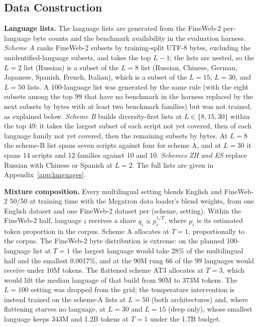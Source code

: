 \subsection{Data Construction}
\label{app:data-construction}

\textbf{Language lists.} The language lists are generated from the FineWeb-2 per-language byte counts and the benchmark availability in the evaluation harness. \emph{Scheme A} ranks FineWeb-2 subsets by training-split UTF-8 bytes, excluding the unidentified-language subsets, and takes the top $L-1$; the lists are nested, so the $L=2$ list (Russian) is a subset of the $L=8$ list (Russian, Chinese, German, Japanese, Spanish, French, Italian), which is a subset of the $L=15$, $L=30$, and $L=50$ lists. A 100-language list was generated by the same rule (with the eight subsets among the top 99 that have no benchmark in the harness replaced by the next subsets by bytes with at least two benchmark families) but was not trained, as explained below. \emph{Scheme B} builds diversity-first lists at $L \in \{8, 15, 30\}$ within the top 49: it takes the largest subset of each script not yet covered, then of each language family not yet covered, then the remaining subsets by bytes. At $L=8$ the scheme-B list spans seven scripts against four for scheme A, and at $L=30$ it spans 14 scripts and 12 families against 10 and 10. \emph{Schemes ZH and ES} replace Russian with Chinese or Spanish at $L=2$. The full lists are given in Appendix~\ref{app:languages}.

\textbf{Mixture composition.} Every multilingual setting blends English and FineWeb-2 50/50 at training time with the Megatron data loader's blend weights, from one English dataset and one FineWeb-2 dataset per (scheme, setting). Within the FineWeb-2 half, language $i$ receives a share $q_i \propto p_i^{1/T}$, where $p_i$ is its estimated token proportion in the corpus. Scheme A allocates at $T=1$, proportionally to the corpus. The FineWeb-2 byte distribution is extreme: on the planned 100-language list at $T=1$ the largest language would take 28\% of the multilingual half and the smallest 0.0017\%, and at the 90M rung 66 of the 99 languages would receive under 10M tokens. The flattened scheme AT3 allocates at $T=3$, which would lift the median language of that build from 90M to 373M tokens. The $L=100$ setting was dropped from the grid; the temperature intervention is instead trained on the scheme-A lists at $L=50$ (both architectures) and, where flattening starves no language, at $L=30$ and $L=15$ (deep only), whose smallest language keeps 343M and 1.2B tokens at $T=1$ under the 1.7B budget.

